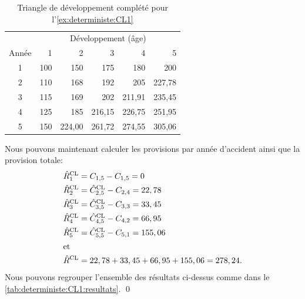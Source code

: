 \begin{exemple}
  \begin{table}
    \centering
    \caption{Triangle de développement complété pour
      l'\autoref{ex:deterministe:CL1}}
    \label{tab:deterministe:CL1:complet}
    \begin{tabular}{crrrrr}
      \toprule
      & \multicolumn{5}{c}{Développement (âge)} \\
      Année & 1 & 2 & 3 & 4 & 5 \\
      \midrule
      1 & 100 & 150    & 175    & 180    & 200    \\
      2 & 110 & 168    & 192    & 205    & 227,78 \\
      3 & 115 & 169    & 202    & 211,91 & 235,45 \\
      4 & 125 & 185    & 216,15 & 226,75 & 251,95 \\
      5 & 150 & 224,00 & 261,72 & 274,55 & 305,06 \\
      \bottomrule
    \end{tabular}
  \end{table}

  Nous pouvons maintenant calculer les provisions par année d'accident
  ainsi que la provision totale:
  \begin{align*}
    \hat{R}_1^{\text{CL}}
    &= C_{1, 5} - C_{1, 5} = 0 \\
    \hat{R}_2^{\text{CL}}
    &= \hat{C}_{2, 5}^{\text{CL}} - C_{2, 4} = 22,78 \\
    \hat{R}_3^{\text{CL}}
    &= \hat{C}_{3, 5}^{\text{CL}} - C_{3, 3} = 33,45 \\
    \hat{R}_4^{\text{CL}}
    &= \hat{C}_{4, 5}^{\text{CL}} - C_{4, 2} = 66,95 \\
    \hat{R}_5^{\text{CL}}
    &= \hat{C}_{5, 5}^{\text{CL}} - C_{5, 1} = 155,06 \\
    \intertext{et}
    \hat{R}^{\text{CL}}
    &= 22,78 + 33,45 + 66,95 + 155,06 = 278,24.
  \end{align*}
  Nous pouvons regrouper l'ensemble des résultats ci-dessus comme dans
  le \autoref{tab:deterministe:CL1:resultats}. %
  \qed


\end{exemple}
